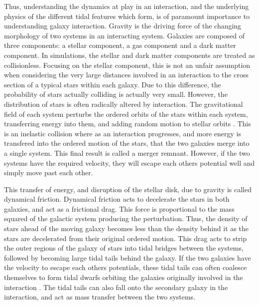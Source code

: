 Thus, understanding the dynamics at play in an interaction, and the underlying physics of the different tidal features which form, is of paramount importance to understanding galaxy interaction. Gravity is the driving force of the changing morphology of two systems in an interacting system. Galaxies are composed of three components: a stellar component, a gas component and a dark matter component. In simulations, the stellar and dark matter components are treated as collisionless. Focusing on the stellar component, this is not an unfair assumption when considering the very large distances involved in an interaction to the cross section of a typical stars within each galaxy. Due to this difference, the probability of stars actually colliding is actually very small. However, the distribution of stars is often radically altered by interaction. The gravitational field of each system perturbs the ordered orbits of the stars within each system, transferring energy into them, and adding random motion to stellar orbits \citep{Holmberg 1941 or Alladin 1965}. This is an inelastic collision where as an interaction progresses, and more energy is transfered into the ordered motion of the stars, that the two galaxies merge into a single system. This final result is called a merger remnant. However, if the two systems have the required velocity, they will escape each others potential well and simply move past each other.

This transfer of energy, and disruption of the stellar disk, due to gravity is called dynamical friction. Dynamical friction acts to decelerate the stars in both galaxies, and act as a frictional drag. This force is proportional to the mass squared of the galactic system producing the perturbation. Thus, the density of stars ahead of the moving galaxy becomes less than the density behind it as the stars are decelerated from their original ordered motion. This drag acts to strip the outer regions of the galaxy of stars into tidal bridges between the systems, followed by becoming large tidal tails behind the galaxy. If the two galaxies have the velocity to escape each others potentials, these tidal tails can often coalesce themselves to form tidal dwarfs orbiting the galaxies originally involved in the interaction \citep{Paper about tidal dwarfs}. The tidal tails can also fall onto the secondary galaxy in the interaction, and act as mass transfer between the two systems.


